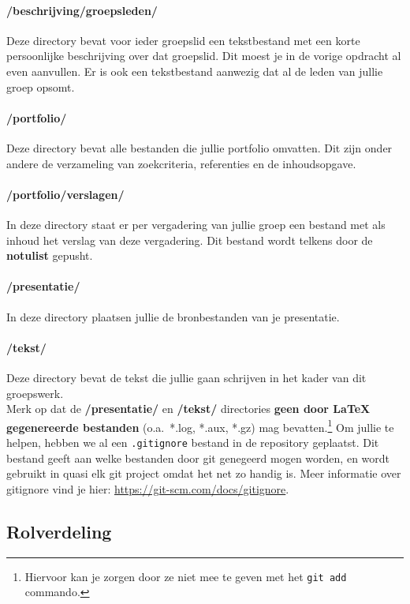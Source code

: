 \documentclass[a4paper]{article}
\begin{document}
\paragraph{/beschrijving/groepsleden/}
Deze directory bevat voor ieder groepslid een tekstbestand met een korte persoonlijke beschrijving over dat groepslid.
Dit moest je in de vorige opdracht al even aanvullen.
Er is ook een tekstbestand aanwezig dat al de leden van jullie groep opsomt.
\paragraph{/portfolio/}
Deze directory bevat alle bestanden die jullie portfolio omvatten.
Dit zijn onder andere de verzameling van zoekcriteria, referenties en de inhoudsopgave.
\paragraph{/portfolio/verslagen/}
In deze directory staat er per vergadering van jullie groep een bestand met als inhoud het verslag van deze vergadering.
Dit bestand wordt telkens door de \textbf{notulist} gepusht.
\paragraph{/presentatie/}
In deze directory plaatsen jullie de bronbestanden van je presentatie.
\paragraph{/tekst/}
Deze directory bevat de tekst die jullie gaan schrijven in het kader van dit groepswerk.\\

Merk op dat de \textbf{/presentatie/} en \textbf{/tekst/} directories \textbf{geen door \LaTeX{} gegenereerde bestanden} (o.a.\ *.log, *.aux, *.gz) mag bevatten.\footnote{Hiervoor kan je zorgen door ze niet mee te geven met het \texttt{git add} commando.}
Om jullie te helpen, hebben we al een \texttt{.gitignore} bestand in de repository geplaatst.
Dit bestand geeft aan welke bestanden door git genegeerd mogen worden, en wordt gebruikt in quasi elk git project omdat het net zo handig is.
Meer informatie over gitignore vind je hier: \url{https://git-scm.com/docs/gitignore}.


\subsection{Rolverdeling}
\end{document}

